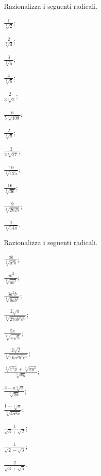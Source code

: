 \begin{esercizio}
 \label{ese:2.72}
Razionalizza i seguenti radicali.
 \begin{multicols}{4}
 \begin{enumeratea}
 \item $\frac 1{\sqrt[3]2}$;
 \item $\frac 2{\sqrt[3]4}$;
 \item $\frac 3{\sqrt[3]5}$;
 \item $\frac 4{\sqrt[3]6}$;
 \item $\frac 2{3\sqrt[3]2}$;
 \item $\frac 6{5\sqrt[3]{100}}$;
 \item $\frac 2{\sqrt[5]9}$;
 \item $\frac 3{2\sqrt[6]{27}}$;
 \item $\frac{10}{\sqrt[5]{125}}$;
 \item $\frac{16}{\sqrt[3]{36}}$;
 \item $\frac 9{\sqrt[4]{2025}}$;
 \item $\frac 1{\sqrt[5]{144}}$.
 \end{enumeratea}
 \end{multicols}
\end{esercizio}


\begin{esercizio}[\Ast]
 \label{ese:2.73}
Razionalizza i seguenti radicali.
 \begin{multicols}{4}
 \begin{enumeratea}
 \item $\frac{ab}{\sqrt[3]{a^2b}}$;
 \item $\frac{ab^2}{\sqrt[3]{ab^2}}$;
 \item $\frac{3a^2b}{\sqrt[4]{9ab^3}}$;
 \item $\frac{2\sqrt a}{\sqrt[4]{27ab^2c^5}}$;
 \item $\frac{5x}{\sqrt[3]{x\sqrt 5}}$;
 \item $\frac{2\sqrt 2}{\sqrt[5]{16a^2b^3c^4}}$;
 \item $\frac{\sqrt[3]{x^2y}+\sqrt[3]{xy^2}}{\sqrt[3]{xy}}$;
 \item $\frac{3-a\sqrt[3]9}{\sqrt[3]{9a}}$;
 \item $\frac{1-\sqrt[3]a}{\sqrt[3]{4a^2x}}$;
 \item $\frac 1{\sqrt 3+\sqrt 2}$;
 \item $\frac 1{\sqrt 2-\sqrt 3}$;
 \item $\frac 2{\sqrt 3+\sqrt 5}$.
 \end{enumeratea}
 \end{multicols}
\end{esercizio}

